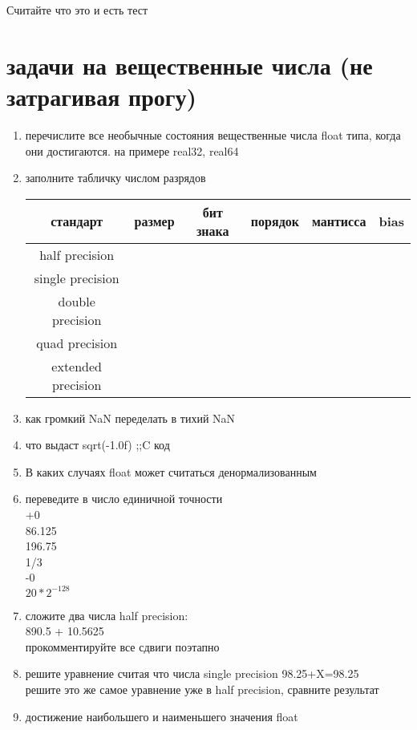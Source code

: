 \documentclass[a4paper,10pt]{article}
\begin{document}
Считайте что это и есть тест

\section*{задачи на вещественные числа (не затрагивая прогу)}
\begin{enumerate}
    \item перечислите все необычные состояния вещественные числа float типа, когда они достигаются. на примере real32, real64
    \item заполните табличку числом разрядов \\
    \begin{tabular}{|c|c|c|c|c|c|}
        \hline
        стандарт& размер & бит знака & порядок & мантисса & bias \\
        \hline
        half precision & & & & \\
        \hline
        single precision & & & & \\
        \hline
        double precision & & & & \\
        \hline
        quad precision & & & & \\
        \hline
        extended precision & & & & \\
        \hline
    \end{tabular}
    \item как громкий NaN переделать в тихий NaN
    \item что выдаст sqrt(-1.0f) ;;C код
    \item В каких случаях float может считаться денормализованным
    \item переведите в число единичной точности\\
    +0 \\ 
    86.125 \\
    196.75 \\
    1/3 \\
    -0 \\
    $20*2^{-128}$ \\
    \item сложите два числа half precision: \\
    890.5 + 10.5625\\
    прокомментируйте все сдвиги поэтапно \\
    \item решите уравнение считая что числа single precision
    98.25+X=98.25\\
    решите это же самое уравнение уже в half precision, сравните результат \\
    \item достижение наибольшего и наименьшего значения float \\
\end{enumerate}
\end{document}
